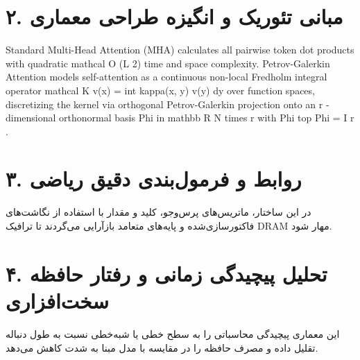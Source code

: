 \documentclass[12pt,a4paper]{article}
\begin{document}
\section*{۲. مبانی تئوریک و انگیزه طراحی معماری}
Standard Multi-Head Attention (MHA) calculates all pairwise token dot products with quadratic mathcal O (L 2) time and space complexity. Petrov-Galerkin Attention models self-attention as a continuous non-local Fredholm integral operator mathcal K v(x) = int kappa(x, y) v(y) dy over function spaces, discretizing the kernel via orthogonal Petrov-Galerkin projection onto an r -dimensional orthonormal basis Phi in mathbb R N times r with Phi top Phi = I r .

\section*{۳. روابط و فرمول‌بندی دقیق ریاضی}
در این ساختار، ماتریس‌های پرس‌وجو، کلید و مقدار با استفاده از نگاشت‌های فاکتورسازی‌شده و پایه‌های متعامد بازآرایی می‌گردند تا ترافیک DRAM مهار شود.

\section*{۴. تحلیل پیچیدگی زمانی و رفتار حافظه سخت‌افزاری}
این معماری پیچیدگی محاسباتی را به سطح خطی یا شبه‌خطی نسبت به طول دنباله تقلیل داده و مصرف حافظه را در مقایسه با مدل مبنا به شدت کاهش می‌دهد.
\end{document}
